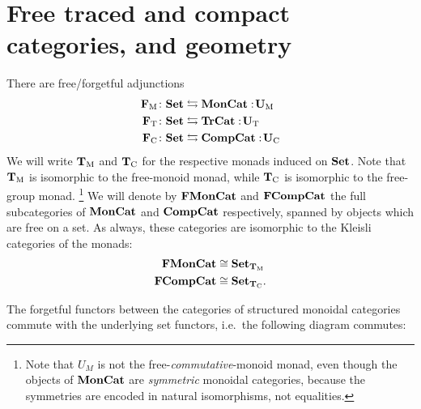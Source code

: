 \documentclass[12pt,oneside,article,draft]{memoir}
\begin{document}
\section{Free traced and compact categories, and geometry}\label{sec:free and geometry}

There are free/forgetful adjunctions
\begin{align*}
   \mathbf{F}_{\textrm{M}}\colon\mathbf{Set} &\leftrightarrows\mathbf{MonCat}:\!\mathbf{U}_{\textrm{M}} \\
   \mathbf{F}_{\textrm{T}}\colon\mathbf{Set} &\leftrightarrows\mathbf{TrCat}:\!\mathbf{U}_{\textrm{T}} \\
   \mathbf{F}_{\textrm{C}}\colon\mathbf{Set} &\leftrightarrows\mathbf{CompCat}:\!\mathbf{U}_{\textrm{C}}
\end{align*}
We will write $\mathbf{T}_{\textrm{M}}$ and $\mathbf{T}_{\textrm{C}}$ for the respective monads induced on $\mathbf{Set}$. Note that $\mathbf{T}_{\textrm{M}}$ is
isomorphic to the free-monoid monad, while $\mathbf{T}_{\textrm{C}}$ is isomorphic to the free-group monad.%
\footnote{Note that $U_M$ is not the free-\emph{commutative}-monoid monad, even though the objects of $\mathbf{MonCat}$ are \emph{symmetric} monoidal categories, because the symmetries are encoded in natural isomorphisms, not equalities.
}
We will denote by $\mathbf{FMonCat}$ and $\mathbf{FCompCat}$ the full subcategories of $\mathbf{MonCat}$ and $\mathbf{CompCat}$
respectively, spanned by objects which are free on a set. As always, these categories are isomorphic
to the Kleisli categories of the monads: 
\begin{align}\label{dia:TMvsFrMonCat}
\mathbf{FMonCat}&\cong\mathbf{Set}_{\mathbf{T}_{\textrm{M}}}
\\\nonumber
\mathbf{FCompCat}&\cong\mathbf{Set}_{\mathbf{T}_{\textrm{C}}}.
\end{align}

The forgetful functors between the categories of structured monoidal categories commute with the
underlying set functors, i.e.~the following diagram commutes:
\end{document}
